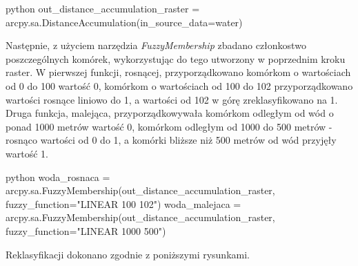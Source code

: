 \documentclass{article}
\begin{document}
\begin{mintedbox}{python}
out_distance_accumulation_raster = arcpy.sa.DistanceAccumulation(in_source_data=water)
\end{mintedbox}
\vspace{10pt}

Następnie, z użyciem narzędzia \textit{FuzzyMembership} zbadano członkostwo poszczególnych komórek, wykorzystując do tego utworzony w poprzednim kroku raster. W pierwszej funkcji, rosnącej, przyporządkowano komórkom o wartościach od 0 do 100 wartość 0, komórkom o wartościach od 100 do 102 przyporządkowano wartości rosnące liniowo do 1,  a wartości od 102 w górę zreklasyfikowano na 1. Druga funkcja, malejąca, przyporządkowywała komórkom odległym od wód o ponad 1000 metrów wartość 0, komórkom odległym od 1000 do 500 metrów - rosnąco wartości od 0 do 1, a komórki bliższe niż 500 metrów od wód przyjęły wartość 1. 
\vspace{5pt}

\begin{mintedbox}{python}
woda_rosnaca = arcpy.sa.FuzzyMembership(out_distance_accumulation_raster, fuzzy_function="LINEAR 100 102")
woda_malejaca = arcpy.sa.FuzzyMembership(out_distance_accumulation_raster, fuzzy_function="LINEAR 1000 500")
\end{mintedbox}
\vspace{10pt}

Reklasyfikacji dokonano zgodnie z poniższymi rysunkami.
\end{document}

